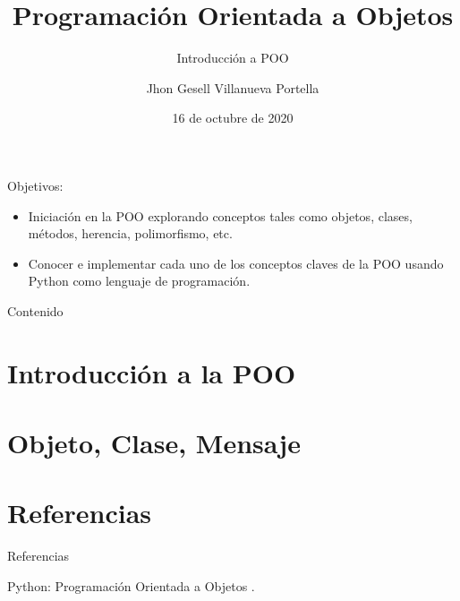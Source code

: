 \documentclass[10pt]{beamer}
\author[Jhon]{Jhon Gesell Villanueva Portella\inst{1}}
\title[Sesión 07]{Programación Orientada a Objetos}
\date{16 de octubre de 2020}
\subtitle{Introducción a POO}
\institute[TLS]{
\inst{1}
Tolouse Lautrec.\\
\vspace{2mm}

}
\begin{document}
\begin{frame}
\maketitle
\end{frame}
\begin{frame}{Objetivos:}
\begin{itemize}
\item Iniciación en la POO explorando conceptos tales como objetos, clases, métodos, herencia, polimorfismo, etc.
\item Conocer e implementar cada uno de los conceptos claves de la POO usando Python como lenguaje de programación.
\end{itemize}
\end{frame}
\begin{frame}{Contenido}
\tableofcontents
\end{frame}
\section{Introducción a la POO}

\section{Objeto, Clase, Mensaje}

%
%
%		



\appendix
\section{Referencias}
\begin{frame}{Referencias}
\begin{thebibliography}{8}

\beamertemplatebookbibitems
Python: Programación Orientada a Objetos
.

\end{thebibliography}
\end{frame}
\end{document}
